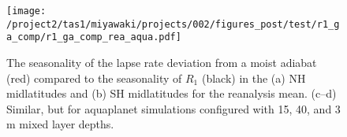 \documentclass{article}
\begin{document}
\begin{figure}
    \texttt{[image: /project2/tas1/miyawaki/projects/002/figures\_post/test/r1\_ga\_comp/r1\_ga\_comp\_rea\_aqua.pdf]}
    \caption{The seasonality of the lapse rate deviation from a moist adiabat (red) compared to the seasonality of $R_1$ (black) in the (a) NH midlatitudes and (b) SH midlatitudes for the reanalysis mean. (c--d) Similar, but for aquaplanet simulations configured with 15, 40, and 3 m mixed layer depths.}
    \label{fig:r1-ga-comp-aqua}
\end{figure}




\end{document}
